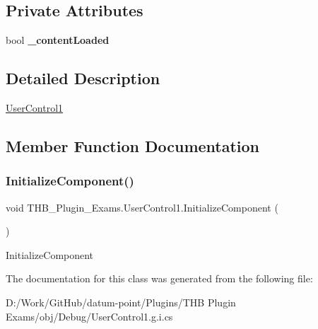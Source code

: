 \subsection*{Private Attributes}
\begin{DoxyCompactItemize}
\item 
\mbox{\label{class_t_h_b___plugin___exams_1_1_user_control1_a0af4bcadce35594e7decef2aca6ae954}} 
bool {\bfseries \+\_\+content\+Loaded}
\end{DoxyCompactItemize}


\subsection{Detailed Description}
\mbox{\hyperlink{class_t_h_b___plugin___exams_1_1_user_control1}{User\+Control1}} 



\subsection{Member Function Documentation}
\mbox{\label{class_t_h_b___plugin___exams_1_1_user_control1_a00b30a8b0179c27805d9f9565070adba}} 
\subsubsection{\texorpdfstring{Initialize\+Component()}{InitializeComponent()}}
{\footnotesize\ttfamily void T\+H\+B\+\_\+\+Plugin\+\_\+\+Exams.\+User\+Control1.\+Initialize\+Component (\begin{DoxyParamCaption}{ }\end{DoxyParamCaption})}



Initialize\+Component 



The documentation for this class was generated from the following file\+:\begin{DoxyCompactItemize}
\item 
D\+:/\+Work/\+Git\+Hub/datum-\/point/\+Plugins/\+T\+H\+B Plugin Exams/obj/\+Debug/User\+Control1.\+g.\+i.\+cs\end{DoxyCompactItemize}
